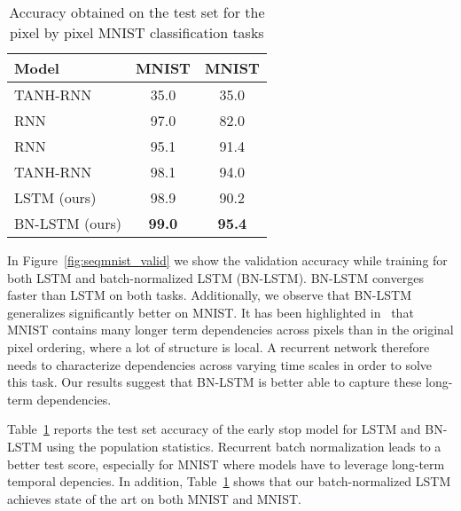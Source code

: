 \documentclass{article} \pdfoutput=1 \usepackage[utf8]{inputenc}
\begin{document}
\begin{table}[!hb]
\center
\begin{tabular}{@{}lcc@{}}
  \toprule
  \bf Model & \bf MNIST & \bf MNIST \\
  \midrule
  TANH-RNN~\citep{le2015simple} & 35.0 & 35.0\\
  RNN~\citep{le2015simple} & 97.0 & 82.0\\
  RNN~\citep{urnn} & 95.1 & 91.4\\
  TANH-RNN~\citep{zhang2016architectural} & 98.1 & 94.0\\
  \midrule
  LSTM (ours) & 98.9 & 90.2\\
  BN-LSTM (ours) & \textbf{99.0} & \textbf{95.4}\\
  \bottomrule
\end{tabular}
\caption{Accuracy obtained on the test set for the pixel by pixel MNIST classification tasks}
\label{tab:seqmnist_test}

\end{table}

In Figure~\ref{fig:seqmnist_valid} we show the validation accuracy while
training for both LSTM and batch-normalized LSTM (BN-LSTM).  BN-LSTM converges
faster than LSTM on both tasks.  Additionally, we observe that BN-LSTM
generalizes significantly better on MNIST.  It has been highlighted
in~\cite{urnn} that MNIST contains many longer term dependencies across
pixels than in the original pixel ordering, where a lot of structure is local.
A recurrent network therefore needs to characterize dependencies across varying
time scales in order to solve this task.  Our results suggest that BN-LSTM is
better able to capture these long-term dependencies.

Table~\ref{tab:seqmnist_test} reports the test set accuracy of the early stop
model for LSTM and BN-LSTM using the population statistics.  Recurrent batch
normalization leads to a better test score, especially for MNIST where
models have to leverage long-term temporal depencies.  In addition,
Table~\ref{tab:seqmnist_test} shows that our batch-normalized LSTM achieves
state of the art on both MNIST and MNIST.
\end{document}
